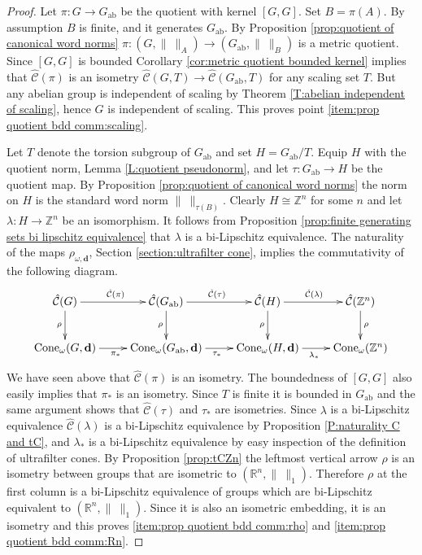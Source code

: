 \documentclass[12pt]{amsart}
\theoremstyle{definition}
\def\RR{\ensuremath{\mathbb{R}}}
\def\ZZ{\ensuremath{\mathbb{Z}}}
\newcommand{\B}[1]{\mathbf{#1}}
\newcommand{\OP}[1]{\operatorname{#1}}
\def\Cone{\OP{Cone}}
\def\tC{\hat{\mathcal{C}}}
\begin{document}
\begin{proof}
Let $\pi \colon G \to G_{\OP{ab}}$ be the quotient with kernel $[G,G]$.
Set $B=\pi(A)$.
By assumption $B$ is finite, and it generates $G_{\OP{ab}}$.
By Proposition \ref{prop:quotient of canonical word norms} $\pi \colon (G,\| \ \|_A) \to (G_{\OP{ab}},\| \ \|_B)$ is a metric quotient.
Since $[G,G]$ is bounded Corollary \ref{cor:metric quotient bounded kernel} implies that $\tC(\pi)$ is an isometry $\tC(G,T) \to \tC(G_{\OP{ab}},T)$ for any scaling set $T$.
But any abelian group is independent of scaling by Theorem \ref{T:abelian independent of scaling}, hence $G$ is independent of scaling.
This proves point \ref{item:prop quotient bdd comm:scaling}.

Let $T$ denote the torsion subgroup of $G_{\OP{ab}}$ and set $H=G_{\OP{ab}}/T$.
Equip $H$ with the quotient norm, Lemma \ref{L:quotient pseudonorm}, and let $\tau \colon G_{\OP{ab}} \to H$ be the quotient map.
By Proposition \ref{prop:quotient of canonical word norms} the norm on $H$ is the standard word norm $\| \ \|_{\tau(B)}$.
Clearly $H \cong \ZZ^n$ for some $n$ and let $\lambda \colon H \to \ZZ^n$ be an isomorphism.
It follows from Proposition \ref{prop:finite generating sets bi lipschitz equivalence} that $\lambda$ is a bi-Lipschitz equivalence.
The naturality of the maps $\rho_{\omega,\B d}$, Section \ref{section:ultrafilter cone}, implies the commutativity of the following diagram.
\[
\xymatrix{
\tC(G) \ar[r]^{\tC(\pi)} \ar[d]_{\rho} 
& 
\tC(G_{\OP{ab}}) \ar[d]_\rho \ar[r]^{\tC(\tau)} 
&
\tC(H) \ar[d]_\rho \ar[r]^{\tC(\lambda)} 
&
\tC(\ZZ^n) \ar[d]^\rho
\\
\Cone_\omega(G,\B d) 
\ar[r]_{\pi_*} &
\Cone_\omega(G_{\OP{ab}},\B d) 
\ar[r]_{\tau_*} &
\Cone_\omega(H,\B d) 
\ar[r]_{\lambda_*} &
\Cone_\omega(\ZZ^n)
}
\]
We have seen above that $\tC(\pi)$ is an isometry.
The boundedness of $[G,G]$ also easily implies that $\pi_*$ is an isometry.
Since $T$ is finite it is bounded in $G_{\OP{ab}}$ and the same argument shows that $\tC(\tau)$ and $\tau_*$ are isometries.
Since $\lambda$ is a bi-Lipschitz equivalence $\tC(\lambda)$ is a bi-Lipschitz equivalence by Proposition \ref{P:naturality C and tC}, and $\lambda_*$ is a bi-Lipschitz equivalence by easy inspection of the definition of ultrafilter cones.
By Proposition \ref{prop:tCZn} the leftmost vertical arrow $\rho$ is an isometry between groups that are isometric to $(\RR^n,\| \ \|_1)$.
Therefore $\rho$ at the first column is a bi-Lipschitz equivalence of groups which are bi-Lipschitz equivalent to $(\RR^n,\| \ \|_1)$.
Since it is also an isometric embedding, it is an isometry and this proves \ref{item:prop quotient bdd comm:rho} and \ref{item:prop quotient bdd comm:Rn}.
\end{proof}
\end{document}
